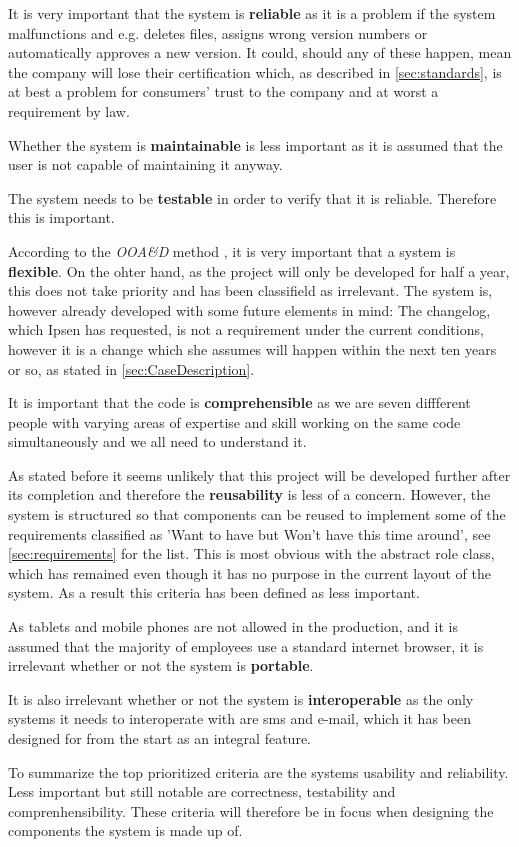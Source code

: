It is very important that the system is \textbf{reliable} as it is a problem if the system malfunctions and e.g. deletes files, assigns wrong version numbers or automatically approves a new version.
It could, should any of these happen, mean the company will lose their certification which, as described in \cref{sec:standards}, is at best a problem for consumers' trust to the company and at worst a requirement by law.

Whether the system is \textbf{maintainable} is less important as it is assumed that the user is not capable of maintaining it anyway.

The system needs to be \textbf{testable} in order to verify that it is reliable.
Therefore this is important.

According to the \textit{OOA\&D} method \citep[p.~182]{Rod-Aalborg}, it is very important that a system is \textbf{flexible}.
On the ohter hand, as the project will only be developed for half a year, this does not take priority and has been classifield as irrelevant.
The system is, however already developed with some future elements in mind: The changelog, which Ipsen has requested, is not a requirement under the current conditions, however it is a change which she assumes will happen within the next ten years or so, as stated in \cref{sec:CaseDescription}.

It is important that the code is \textbf{comprehensible} as we are seven diffferent people with varying areas of expertise and skill working on the same code simultaneously and we all need to understand it.

As stated before it seems unlikely that this project will be developed further after its completion and therefore the \textbf{reusability} is less of a concern.
However, the system is structured so that components can be reused to implement some of the requirements classified as 'Want to have but Won't have this time around', see \cref{sec:requirements} for the list.
This is most obvious with the abstract role class, which has remained even though it has no purpose in the current layout of the system.
As a result this criteria has been defined as less important.

As tablets and mobile phones are not allowed in the production, and it is assumed that the majority of employees use a standard internet browser, it is irrelevant whether or not the system is \textbf{portable}.

It is also irrelevant whether or not the system is \textbf{interoperable} as the only systems it needs to interoperate with are sms and e-mail, which it has been designed for from the start as an integral feature.

To summarize the top prioritized criteria are the systems usability and reliability.
Less important but still notable are correctness, testability and comprenhensibility.
These criteria will therefore be in focus when designing the components the system is made up of.
